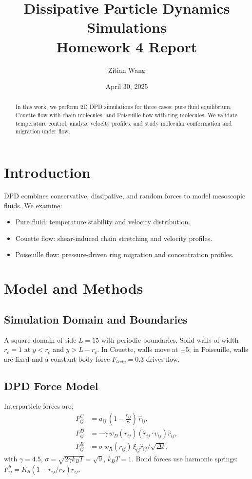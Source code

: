 \documentclass[11pt,a4paper]{article}
\title{Dissipative Particle Dynamics Simulations\\\large Homework 4 Report}
\author{Zitian Wang}
\date{April 30, 2025}
\begin{document}
\maketitle

\begin{abstract}
In this work, we perform 2D DPD simulations for three cases: pure fluid equilibrium, Couette flow with chain molecules, and Poiseuille flow with ring molecules. We validate temperature control, analyze velocity profiles, and study molecular conformation and migration under flow.
\end{abstract}

\section{Introduction}
DPD combines conservative, dissipative, and random forces to model mesoscopic fluids. We examine:
\begin{itemize}
  \item Pure fluid: temperature stability and velocity distribution.
  \item Couette flow: shear-induced chain stretching and velocity profiles.
  \item Poiseuille flow: pressure-driven ring migration and concentration profiles.
\end{itemize}

\section{Model and Methods}
\subsection{Simulation Domain and Boundaries}
A square domain of side $L=15$ with periodic boundaries. Solid walls of width $r_c=1$ at $y<r_c$ and $y>L-r_c$. In Couette, walls move at $\pm5$; in Poiseuille, walls are fixed and a constant body force $F_{body}=0.3$ drives flow.

\subsection{DPD Force Model}
Interparticle forces are:\
\begin{align*}
F^C_{ij}&=a_{ij}\,(1-\tfrac{r_{ij}}{r_c})\,\hat r_{ij},\\
F^D_{ij}&=-\gamma\,w_D(r_{ij})(\hat r_{ij}\cdot v_{ij})\hat r_{ij},\\
F^R_{ij}&=\sigma\,w_R(r_{ij})\,\xi_{ij}\hat r_{ij}/\sqrt{\Delta t},
\end{align*}
with $\gamma=4.5$, $\sigma=\sqrt{2\gamma k_BT}=\sqrt{9}$, $k_BT=1$. Bond forces use harmonic springs: $F^S_{ij}=K_S(1- r_{ij}/r_S)\hat r_{ij}$.
\end{document}
